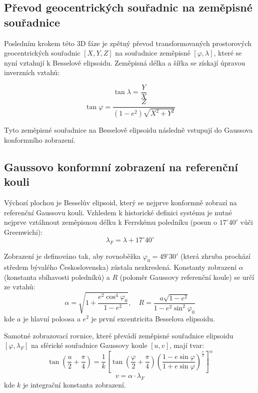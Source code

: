 \documentclass[12pt, a4paper]{article}
\begin{document}
\subsection{Převod geocentrických souřadnic na zeměpisné souřadnice}
Posledním krokem této 3D fáze je zpětný převod transformovaných prostorových geocentrických souřadnic $[X, Y, Z]$ na souřadnice zeměpisné $[\varphi, \lambda]$, které se nyní vztahují k Besselově elipsoidu. Zeměpisná délka a šířka se získají úpravou inverzních vztahů:

$$\tan \lambda = \frac{Y}{X}$$
$$\tan \varphi = \frac{Z}{(1 - e^2)\sqrt{X^2 + Y^2}}$$

Tyto zeměpisné souřadnice na Besselově elipsoidu následně vstupují do Gaussova konformního zobrazení.

\subsection{Gaussovo konformní zobrazení na referenční kouli}
Výchozí plochou je Besselův elipsoid, který se nejprve konformně zobrazí na referenční Gaussovu kouli. Vzhledem k historické definici systému je nutné nejprve vztáhnout zeměpisnou délku k Ferrskému poledníku (posun o $17^\circ 40'$ vůči Greenwichi):
\begin{equation}
    \lambda_F = \lambda + 17^\circ 40'
\end{equation}

Zobrazení je definováno tak, aby rovnoběžka $\varphi_0 = 49^\circ 30'$ (která zhruba prochází středem bývalého Československa) zůstala nezkreslená. Konstanty zobrazení $\alpha$ (konstanta sbíhavosti poledníků) a $R$ (poloměr Gaussovy referenční koule) se určí ze vztahů:
\begin{equation}
    \alpha = \sqrt{1 + \frac{e^2 \cos^4 \varphi_0}{1 - e^2}}, \quad R = \frac{a \sqrt{1 - e^2}}{1 - e^2 \sin^2 \varphi_0}
\end{equation}
kde $a$ je hlavní poloosa a $e^2$ je první excentricita Besselova elipsoidu.

Samotné zobrazovací rovnice, které převádí zeměpisné souřadnice elipsoidu $[\varphi, \lambda_F]$ na sférické souřadnice Gaussovy koule $[u, v]$, mají tvar:
\begin{equation}
    \tan\left(\frac{u}{2} + \frac{\pi}{4}\right) = \frac{1}{k} \left[ \tan\left(\frac{\varphi}{2} + \frac{\pi}{4}\right) \left(\frac{1 - e \sin \varphi}{1 + e \sin \varphi}\right)^{\frac{e}{2}} \right]^\alpha
\end{equation}
\begin{equation}
    v = \alpha \cdot \lambda_F
\end{equation}
kde $k$ je integrační konstanta zobrazení.
\end{document}
